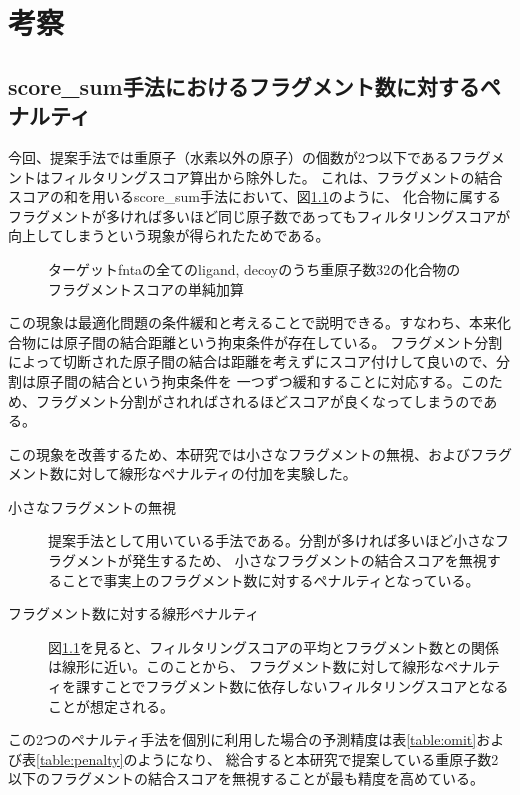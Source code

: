 \chapter{考察}

\section{score\_sum手法におけるフラグメント数に対するペナルティ}
今回、提案手法では重原子（水素以外の原子）の個数が2つ以下であるフラグメントはフィルタリングスコア算出から除外した。
これは、フラグメントの結合スコアの和を用いるscore\_sum手法において、図\ref{fig:no_omit_score_graph}のように、
化合物に属するフラグメントが多ければ多いほど同じ原子数であってもフィルタリングスコアが向上してしまうという現象が得られたためである。
\begin{figure}[bt]
 \begin{center}
  \caption{ターゲットfntaの全てのligand, decoyのうち重原子数32の化合物のフラグメントスコアの単純加算}
  \label{fig:no_omit_score_graph}
 \end{center}
\end{figure}
この現象は最適化問題の条件緩和と考えることで説明できる。すなわち、本来化合物には原子間の結合距離という拘束条件が存在している。
フラグメント分割によって切断された原子間の結合は距離を考えずにスコア付けして良いので、分割は原子間の結合という拘束条件を
一つずつ緩和することに対応する。このため、フラグメント分割がされればされるほどスコアが良くなってしまうのである。

この現象を改善するため、本研究では小さなフラグメントの無視、およびフラグメント数に対して線形なペナルティの付加を実験した。
\begin{description}
\item[小さなフラグメントの無視] 提案手法として用いている手法である。分割が多ければ多いほど小さなフラグメントが発生するため、
	小さなフラグメントの結合スコアを無視することで事実上のフラグメント数に対するペナルティとなっている。
\item[フラグメント数に対する線形ペナルティ]
	図\ref{fig:no_omit_score_graph}を見ると、フィルタリングスコアの平均とフラグメント数との関係は線形に近い。このことから、
	フラグメント数に対して線形なペナルティを課すことでフラグメント数に依存しないフィルタリングスコアとなることが想定される。
\end{description}
この2つのペナルティ手法を個別に利用した場合の予測精度は表\ref{table:omit}および表\ref{table:penalty}のようになり、
総合すると本研究で提案している重原子数2以下のフラグメントの結合スコアを無視することが最も精度を高めている。

